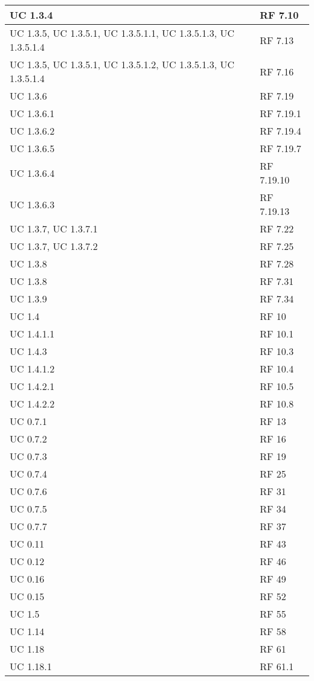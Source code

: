 {\begin{longtable} [c]{| p{4cm} | p{4cm} |}
 \hline 
UC 1.3.4 & RF 7.10\\ 
 \hline 
UC 1.3.5, UC 1.3.5.1, UC 1.3.5.1.1, UC 1.3.5.1.3, UC 1.3.5.1.4 & RF 7.13\\ 
 \hline 
UC 1.3.5, UC 1.3.5.1, UC 1.3.5.1.2, UC 1.3.5.1.3, UC 1.3.5.1.4 & RF 7.16\\ 
 \hline 
UC 1.3.6 & RF 7.19\\ 
 \hline 
UC 1.3.6.1 & RF 7.19.1\\ 
 \hline 
UC 1.3.6.2 & RF 7.19.4\\ 
 \hline 
UC 1.3.6.5 & RF 7.19.7\\ 
 \hline 
UC 1.3.6.4 & RF 7.19.10\\ 
 \hline 
UC 1.3.6.3 & RF 7.19.13\\ 
 \hline 
UC 1.3.7, UC 1.3.7.1 & RF 7.22\\ 
 \hline 
UC 1.3.7, UC 1.3.7.2 & RF 7.25\\ 
 \hline 
UC 1.3.8 & RF 7.28\\ 
 \hline 
UC 1.3.8 & RF 7.31\\ 
 \hline 
UC 1.3.9 & RF 7.34\\ 
 \hline 
UC 1.4 & RF 10\\ 
 \hline 
UC 1.4.1.1 & RF 10.1\\ 
 \hline 
UC 1.4.3 & RF 10.3\\ 
 \hline 
UC 1.4.1.2 & RF 10.4\\ 
 \hline 
UC 1.4.2.1 & RF 10.5\\ 
 \hline 
UC 1.4.2.2 & RF 10.8\\ 
 \hline 
UC 0.7.1 & RF 13\\ 
 \hline 
UC 0.7.2 & RF 16\\ 
 \hline 
UC 0.7.3 & RF 19\\ 
 \hline 
UC 0.7.4 & RF 25\\ 
 \hline 
UC 0.7.6 & RF 31\\ 
 \hline 
UC 0.7.5 & RF 34\\ 
 \hline 
UC 0.7.7 & RF 37\\ 
 \hline 
UC 0.11 & RF 43\\ 
 \hline 
UC 0.12 & RF 46\\ 
 \hline 
UC 0.16 & RF 49\\ 
 \hline 
UC 0.15 & RF 52\\ 
 \hline 
UC 1.5 & RF 55\\ 
 \hline 
UC 1.14 & RF 58\\ 
 \hline 
UC 1.18 & RF 61\\ 
 \hline 
UC 1.18.1 & RF 61.1\\ 

\end{longtable}}
